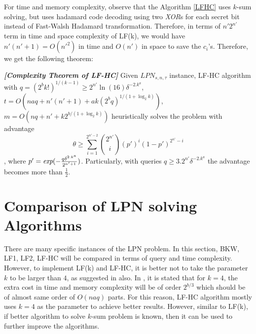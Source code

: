 \documentclass{article}
\begin{document}
 For time and memory complexity, observe that the Algorithm \ref{LFHC} uses $k$-sum solving, but uses hadamard code decoding using two \emph{XOR}s for each secret bit instead of Fast-Walsh Hadamard transformation. Therefore, in terms of $n'2^{n'}$ term in time and space complexity of LF(k), we would have $n'(n'+1)=O(n'^{2})$ in time and $O(n')$ in space to save the $c_i$'s. Therefore, we get the following theorem:
 
 \begin{theorem}\emph{\textbf{[Complexity Theorem of LF-HC]}}
 	Given $LPN_{s,n,\tau}$ instance, LF-HC algorithm with $q=(2^bk!)^{1/(k-1)} \geq 2^{n'}\ln(16)\delta^{-2.k^{a}}$, $t=O(naq+n'(n'+1)+ak(2^bq)^{1/(1+\log_2k)})$, $m=O(nq+n'+k2^{b/(1+\log_2k)})$ heuristically solves the problem with advantage $$\theta\geq\sum_{i=1}^{2^{n'-2}}\binom{2^{n'}}{i}{(p')}^i{(1-p')^{2^{n'}-i}}$$, where $p'=\emph{exp}{(-\frac{q\delta^{2.k^{a}}}{2^{n'+1}})}$. Particularly, with queries $q\geq 3.2^{n'}\delta^{-2.k^{a}}$ the advantage becomes more than $\frac{1}{2}$.
 \end{theorem}
 
 \section{Comparison of LPN solving Algorithms}
  There are many specific instances of the LPN problem. In this section, BKW, LF1, LF2, LF-HC will be compared in terms of query and time complexity. However, to implement LF(k) and LF-HC, it is better not to take the parameter $k$ to be larger than $4$, as suggested in \cite{LFk} also. In \cite{Ksum}, it is stated that for $k=4$, the extra cost in time and memory complexity will be of order $2^{b/3}$ which should be of almost same order of $O(naq)$ parts. For this reason, LF-HC algorithm mostly uses $k=4$ as the parameter to achieve better results. However, similar to LF(k), if better algorithm to solve $k$-sum problem is known, then it can be used to further improve the algorithms.
 
\end{document}
